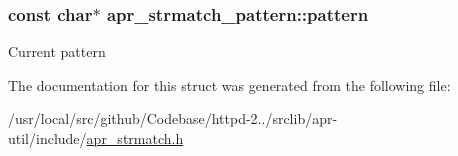 \subsubsection[{\texorpdfstring{pattern}{pattern}}]{\setlength{\rightskip}{0pt plus 5cm}const char$\ast$ apr\+\_\+strmatch\+\_\+pattern\+::pattern}\hypertarget{structapr__strmatch__pattern_ad219bd7708d7be5937cb79e7cfda01c0}{}\label{structapr__strmatch__pattern_ad219bd7708d7be5937cb79e7cfda01c0}
Current pattern 

The documentation for this struct was generated from the following file\+:\begin{DoxyCompactItemize}
\item 
/usr/local/src/github/\+Codebase/httpd-\/2../srclib/apr-\/util/include/\hyperlink{apr__strmatch_8h}{apr\+\_\+strmatch.\+h}\end{DoxyCompactItemize}
